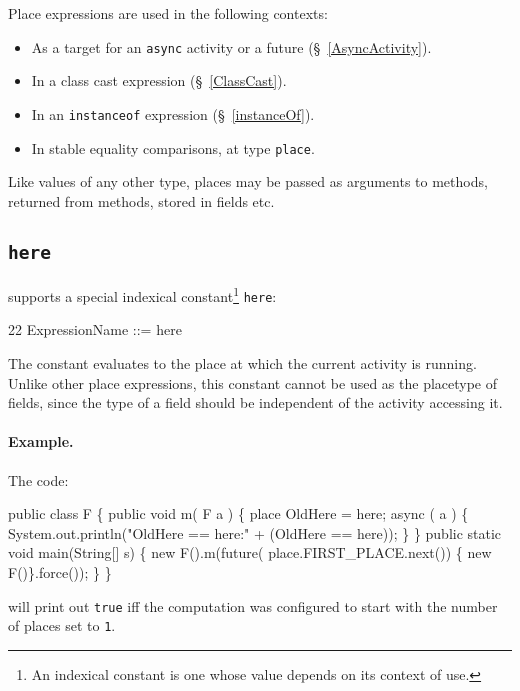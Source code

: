 Place expressions are used in the following contexts: 
\begin{itemize}
\item As a target for an {\tt async} activity or a future
(\S~\ref{AsyncActivity}).
\item In a class cast expression  (\S~\ref{ClassCast}).
\item In an {\tt instanceof} expression (\S~\ref{instanceOf}).
\item In stable equality comparisons, at type {\tt place}.
\end{itemize}

Like values of any other type, places may be passed as arguments
to methods, returned from methods, stored in fields etc.

\subsection{{\tt here}}\label{Here}
\Xten{} supports a special indexical constant\footnote{
An indexical constant is one whose value depends on its context of use.}
  {\tt here}:
\begin{x10}
22 ExpressionName ::= here
\end{x10}
The constant evaluates to the place at which the current activity is
running. Unlike other place expressions, this constant cannot be 
used as the placetype of fields, since the type of a field 
should be independent of the activity accessing it.

\paragraph{Example.}
The code:
\begin{x10}
public class F \{
   public void m( F a ) \{
     place OldHere = here;
     async ( a ) \{
      System.out.println("OldHere == here:" 
                         + (OldHere == here));
     \}
   \}
  public static void main(String[] s) \{
     new F().m(future( place.FIRST\_PLACE.next())
                \{ new F()\}.force());
  \}
\}  
\end{x10}
\noindent will print out {\tt true} iff the computation was configured
to start with the number of places set to {\tt 1}. 

